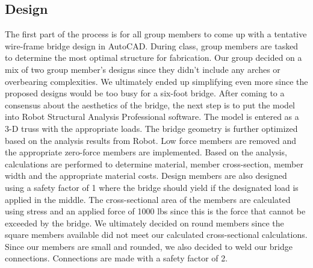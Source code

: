 \documentclass{article}
\begin{document}
    \subsection{Design}
    \indent The first part of the process is for all group members to come up with a tentative wire-frame bridge design in AutoCAD. During class, group members are tasked to determine the most optimal structure for fabrication. Our group decided on a mix of two group member's designs since they didn't include any arches or overbearing complexities. We ultimately ended up simplifying even more since the proposed designs would be too busy for a six-foot bridge. After coming to a consensus about the aesthetics of the bridge, the next step is to put the model into Robot Structural Analysis Professional software. The model is entered as a 3-D truss with the appropriate loads. The bridge geometry is further optimized based on the analysis results from Robot. Low force members are removed and the appropriate zero-force members are implemented. Based on the analysis, calculations are performed to determine material, member cross-section, member width and the appropriate material costs. Design members are also designed using a safety factor of 1 where the bridge should yield if the designated load is applied in the middle. The cross-sectional area of the members are calculated using stress and an applied force of 1000 lbs since this is the force that cannot be exceeded by the bridge. We ultimately decided on round members since the square members available did not meet our calculated cross-sectional calculations. Since our members are small and rounded, we also decided to weld our bridge connections. Connections are made with a safety factor of 2.
\end{document}
